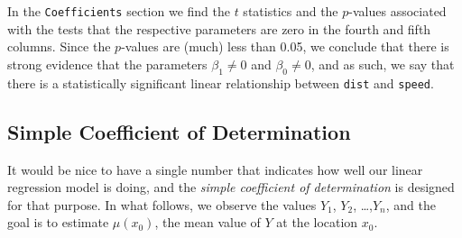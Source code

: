 \documentclass[captions=tableheading]{scrbook}
\begin{document}
In the \texttt{Coefficients} section we find the \(t\) statistics and the \(p\)-values associated with the tests that the respective parameters are zero in the fourth and fifth columns. Since the \(p\)-values are (much) less than 0.05, we conclude that there is strong evidence that the parameters \(\beta_{1}\neq0\) and \(\beta_{0}\neq0\), and as such, we say that there is a statistically significant linear relationship between \texttt{dist} and \texttt{speed}. 
\subsection{Simple Coefficient of Determination}
\label{sec-11-3-2}


It would be nice to have a single number that indicates how well our linear regression model is doing, and the \emph{simple coefficient of determination} is designed for that purpose. In what follows, we observe the values \(Y_{1}\), \(Y_{2}\), \ldots{},\(Y_{n}\), and the goal is to estimate \(\mu(x_{0})\), the mean value of \(Y\) at the location \(x_{0}\). 
\end{document}
